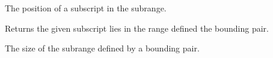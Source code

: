 \begin{haddockdesc}
{\begin{haddockdesc}
\end{haddockdesc}
\begin{haddockdesc}
\item[\begin{tabular}{@{}l}
index :: (a, a) -> a -> Int
\end{tabular}]
{\haddockbegindoc
The position of a subscript in the subrange.\par}
\end{haddockdesc}
\begin{haddockdesc}
\item[\begin{tabular}{@{}l}
inRange :: (a, a) -> a -> Bool
\end{tabular}]
{\haddockbegindoc
Returns  the given subscript lies in the range defined
 the bounding pair.\par}
\end{haddockdesc}
\begin{haddockdesc}
\item[\begin{tabular}{@{}l}
rangeSize :: (a, a) -> Int
\end{tabular}]
{\haddockbegindoc
The size of the subrange defined by a bounding pair.\par}
\end{haddockdesc}}
\end{haddockdesc}
